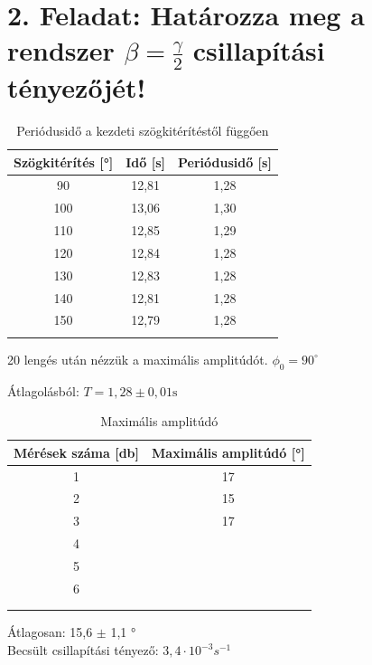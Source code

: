 \documentclass{article}
\begin{document}
\section*{2. Feladat: Határozza meg a rendszer $\beta = \frac{\gamma}{2}$ csillapítási tényezőjét!}

\begin{table}[H]
    \centering
    \begin{tabular}{|c|c|c|}
        \hline
        Szögkitérítés [°] & Idő [s] & Periódusidő [s] \\ \hline
        90 & 12,81 & 1,28\\ \hline 
        100 & 13,06 & 1,30\\ \hline
        110 & 12,85 & 1,29\\ \hline 
        120 & 12,84 & 1,28\\ \hline
        130 & 12,83 & 1,28\\ \hline 
        140 & 12,81 & 1,28\\ \hline
        150 & 12,79&  1,28\\ \hline 
         &  & \\ \hline
    \end{tabular}
    \caption{Periódusidő a kezdeti szögkitérítéstől függően}
    \label{tab:periodusido_2}
\end{table}

20 lengés után nézzük a maximális amplitúdót.
$\phi_0 = 90^\circ$

Átlagolásból: $T = 1,28 \pm 0,01 \text{s}$

\begin{table}[H]
    \centering
    \begin{tabular}{|c|c|}
        \hline
        Mérések száma [db] & Maximális amplitúdó [°] \\ \hline
         1 & 17 \\ \hline 
         2 & 15 \\ \hline
         3 & 17 \\ \hline 
         4 & \\ \hline
         5 & \\ \hline 
         6 & \\ \hline
         & \\ \hline 
         & \\ \hline
    \end{tabular}
    \caption{Maximális amplitúdó}
    \label{tab:max_amplitudo}
\end{table}

Átlagosan: 15,6 $\pm$ 1,1 ° \\
Becsült csillapítási tényező: $3,4 \cdot 10^{-3} s^{-1}$
\end{document}
